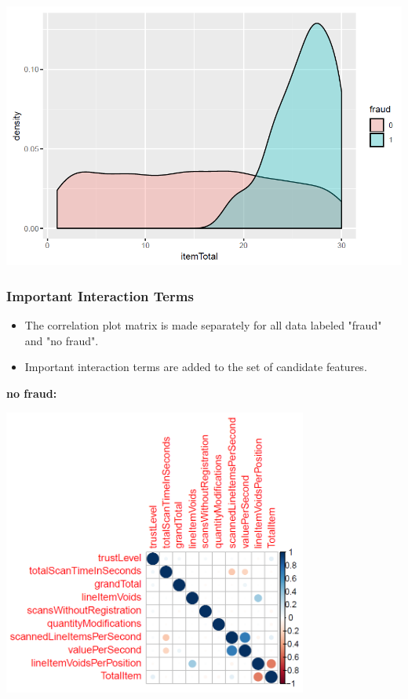 \documentclass{beamer}
\begin{document}
\begin{frame}
        \centering
        \includegraphics[width = \textwidth]{figure/TotalItem.PNG}

\end{frame}

\begin{frame}
\frametitle{Important Interaction Terms}
\begin{itemize}
\item The correlation plot matrix is made separately for all data labeled "fraud" and "no fraud".
\item Important interaction terms are added to the set of candidate features.
\end{itemize}
\end{frame}
\begin{frame}
\textbf{no fraud:}

\includegraphics[width = 0.75\textwidth]{figure/corr_nofraud.PNG}
\end{frame}
\end{document}
